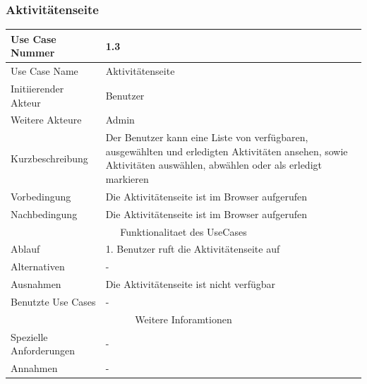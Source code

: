\documentclass[10pt,a4paper]{article}
\begin{document}
	\subsubsection{Aktivit\"atenseite}
	\begin{tabular}{|l|p{.5\linewidth}|}
	\hline Use Case Nummer & 1.3 \\ 
	\hline Use Case Name & Aktivit\"atenseite \\ 
	\hline Initiierender Akteur & Benutzer \\
	\hline Weitere Akteure & Admin \\
	\hline Kurzbeschreibung & Der Benutzer kann eine Liste von verf\"ugbaren, ausgew\"ahlten und erledigten Aktivit\"aten ansehen, sowie Aktivit\"aten ausw\"ahlen, abw\"ahlen oder als erledigt markieren \\
	\hline Vorbedingung & Die Aktivit\"atenseite ist im Browser aufgerufen \\
	\hline Nachbedingung & Die Aktivit\"atenseite ist im Browser aufgerufen \\
	\hline \multicolumn{2}{|c|}{Funktionalitaet des UseCases}\\
	\hline Ablauf & 1. Benutzer ruft die Aktivit\"atenseite auf \\
	\hline Alternativen & - \\
	\hline Ausnahmen & Die Aktivit\"atenseite ist nicht verf\"ugbar \\
	\hline Benutzte Use Cases & - \\
	\hline \multicolumn{2}{|c|}{Weitere Inforamtionen} \\
	\hline Spezielle Anforderungen & - \\
	\hline Annahmen & - \\
	\hline
	\end{tabular} 
\end{document}
